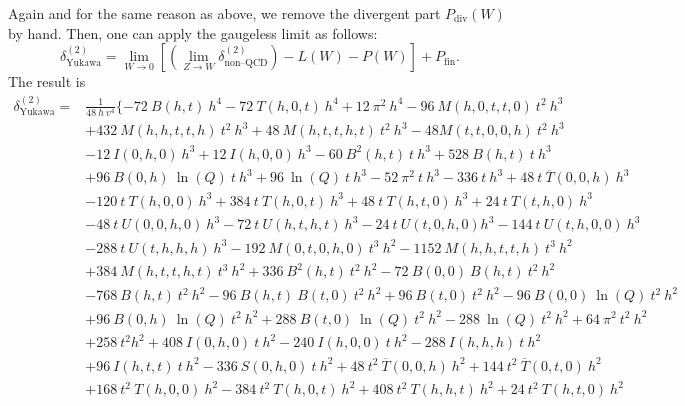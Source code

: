 \documentclass[a4paper,12pt]{book}
\begin{document}
Again and for the same reason as above, we remove the divergent part $P_\text{div}(W)$ by hand. Then, one can apply the gaugeless limit as follows:
\begin{equation}
\delta^{(2)}_\text{Yukawa} =\lim_{W \rightarrow 0}\left[\left(\lim_{Z \rightarrow W}\delta^{(2)}_\text{non--QCD}\right)-L(W)-P(W)\right]+ P_\text{fin}.
\end{equation}
The result is 
\begin{align}
\nonumber
\delta^{(2)}_\text{Yukawa} ={}& \frac{1}{48\> h\> v^4}\{-72\> B(h,t)\> h^4-72 \>T(h,0,t)\> h^4+12\> \pi^2 \>h^4-96\> M(h,0,t,t,0)\> t^2\> h^3\\
\nonumber
&+432\> M(h,h,t,t,h)\> t^2\> h^3+48\> M(h,t,t,h,t)\> t^2\> h^3-48 M(t,t,0,0,h)\> t^2\> h^3\\
\nonumber
&-12\> I(0,h,0)\> h^3+12\> I(h,0,0) \>h^3-60\>
   B^2(h,t)\> t\> h^3+528 \>B(h,t)\> t\> h^3\\
   \nonumber
   &+96\> B(0,h)\> \ln(Q) \>t \>h^3+96\> \ln(Q)\> t
\>h^3-52\> \pi^2 \>t \>h^3-336\> t\>
   h^3+48 \>t\> \overline{T}(0,0,h)\> h^3\\
   \nonumber
   &-120\> t\> T(h,0,0)\> h^3+384\> t\> T(h,0,t)
\>h^3+48\> t\> T(h,t,0)\> h^3+24\> t\>
   T(t,h,0) \>h^3\\
   \nonumber 
   &-48\> t \>U(0,0,h,0) \>h^3-72\> t\> U(h,t,h,t)\> h^3-24\> t\> U(t,0,h,0) h^3-144\> t\> U(t,h,0,0)\>
   h^3\\
   \nonumber
   &-288\> t\> U(t,h,h,h) \>h^3-192\> M(0,t,0,h,0)\> t^3\> h^2-1152\> M(h,h,t,t,h)\> t^3\> h^2\\
   \nonumber 
   &+384\> M(h,t,t,h,t)
\>   t^3 \>h^2+336\> B^2(h,t) \>t^2\> h^2-72\> B(0,0) \>B(h,t)\> t^2\> h^2\\
\nonumber
&-768\> B(h,t)\> t^2\> h^2-96\>
   B(h,t)\> B(t,0)\> t^2 \>h^2+96\> B(t,0)\> t^2\> h^2-96\> B(0,0)\> \ln(Q)
\>t^2 \>h^2\\
\nonumber
&+96 \>B(0,h) \>\ln(Q)\> t^2
   \>h^2+288 \>B(t,0) \>\ln(Q) \>t^2 \>h^2-288 \>\ln(Q)\> t^2 \>h^2+64\> \pi^2\> t^2\> h^2\\
   \nonumber
   &+258\> t^2
h^2+408\> I(0,h,0)\> t\> h^2-240
   \>I(h,0,0)\> t \>h^2-288\> I(h,h,h)\> t\> h^2\\
   \nonumber
   &+96\> I(h,t,t) \>t \>h^2-336 \>S(0,h,0)\> t \>h^2+48\> t^2\>
   \overline{T}(0,0,h)\> h^2+144\> t^2\> \overline{T}(0,t,0)\> h^2\\
   \nonumber
   &+168\> t^2\> T(h,0,0)\>
h^2-384\> t^2 \>T(h,0,t)\> h^2+408
   \>t^2\> T(h,h,t)\> h^2+24\> t^2\> T(h,t,0)\> h^2\\

\end{align}
\end{document}
